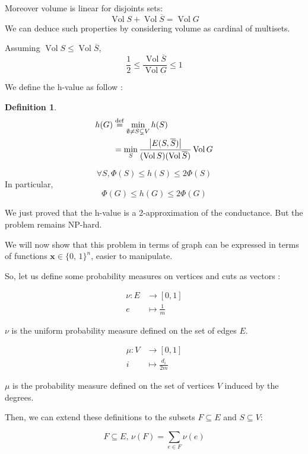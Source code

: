\documentclass[12pt]{article}
\newtheorem{definition}[lemma]{Definition}
\newcommand{\defeq}{\stackrel{{\rm def}}{=}}
\newcommand{\card}[1]{\left\lvert#1\right\rvert}
\newcommand{\NP}{\textsc{NP}}
\DeclareMathOperator{\vol}{Vol}
\begin{document}
Moreover volume is linear for disjoints sets:
\[
    \vol S + \vol \overline{S} = \vol G
\]
We can deduce such properties by considering volume as cardinal of multisets.

Assuming $\vol S \leqslant \vol \overline{S}$,
\[
    \frac{1}{2} \leqslant \frac{\vol \overline{S}}{\vol G} \leqslant 1
\]

We define the h-value as follow :

\begin{definition}
    \[
        \begin{aligned}
            h(G) &\defeq \min\limits_{\emptyset \neq S \subsetneq V} h(S)\\
            &=\min\limits_S \frac{\card{E(S,\overline{S})}}{(\vol S)(\vol \overline{S})} \vol G
        \end{aligned}
    \]
\end{definition}

\[
    \forall S, \Phi(S) \leqslant h(S) \leqslant 2 \Phi(S)
\]
In particular,
\[
    \Phi(G) \leqslant h(G) \leqslant 2 \Phi(G)
\]

We just proved that the h-value is a 2-approximation of the conductance. But the problem remains \NP-hard.

\bigskip

We will now show that this problem in terms of graph can be expressed in terms of functions $\textbf{x} \in \{0,\,1\}^{n}$, easier to manipulate.

So, let us define some probability measures on vertices and cuts as vectors :

\[
    \begin{aligned}
        \nu : E &\to [0,1] \\
           e &\mapsto \frac{1}{m}
    \end{aligned}
\]

$\nu$ is the uniform probability measure defined on the set of edges $E$.

\[
    \begin{aligned}
        \mu : V&\to [0,1]\\
        i &\mapsto \frac{d_i}{2m}
    \end{aligned}
\]

$\mu$ is the probability measure defined on the set of vertices $V$ induced by the degrees.

Then, we can extend these definitions to the subsets $F \subseteq E$ and $S \subseteq V$:

\[
    F\subseteq E,\, \nu(F) = \sum\limits_{e\in F} \nu(e)
\]
\end{document}
